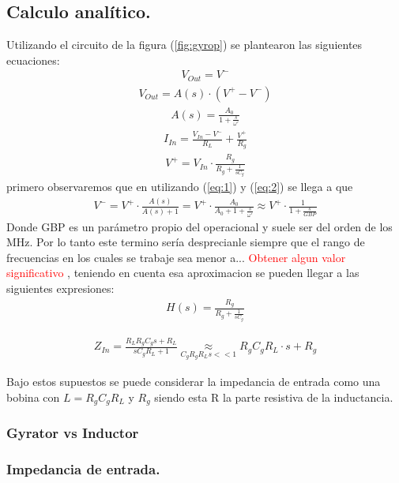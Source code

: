 \documentclass[a4paper]{article}
\begin{document}
\subsection{Calculo analítico.}
Utilizando el circuito de la figura (\ref{fig:gyrop}) se plantearon las siguientes ecuaciones:
\begin{align}   V_{Out} = V^- \label{eq:1}\end{align}
\begin{align} V_{Out} = A(s) \cdot (V^+-V^-)\label{eq:2}\end{align}
\begin{align} A(s)= \frac{A_0}{1+\frac{s}{\omega'}}\end{align}
\begin{align} I_{In}=\frac{V_{In}-V^-}{R_L}+\frac{V^+}{R_g}\end{align}
\begin{align} V^+=V_{In}\cdot \frac{R_g}{R_g+\frac{1}{sC_g}} \end{align}
primero observaremos que en utilizando (\ref{eq:1}) y (\ref{eq:2}) se llega a que 
\begin{align}V^- =V^+ \cdot \frac{A(s)}{A(s)+1} = V^+ \cdot \frac{A_0}{A_0+1+\frac{s}{\omega'}} \approx V^+ \cdot \frac{1}{1+\frac{s}{GBP}}   \end{align}
Donde GBP es un parámetro propio del operacional y suele ser del orden de los MHz. Por lo tanto este termino sería desprecianle siempre que el rango de frecuencias en los cuales se trabaje sea menor a... \center \textcolor{red}{Obtener algun valor significativo}
, teniendo en cuenta esa aproximacion se pueden llegar a las siguientes expresiones:
\begin{align}H(s)= \frac{R_g}{R_g+\frac{1}{sC_g}} \end{align}


\begin{align}Z_{In}=\frac{R_LR_gC_gs+R_L}{sC_gR_L+1}\underset{C_gR_gR_Ls << 1}{\approx}R_gC_gR_L \cdot s + R_g \end{align}

Bajo estos supuestos se puede considerar la impedancia de entrada como una bobina con $L=R_gC_gR_L $ y $R_g$ siendo esta R la parte resistiva de la inductancia.
\subsubsection{Gyrator vs Inductor}

\subsubsection{Impedancia de entrada.}
\end{document}
